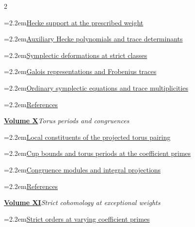 \documentclass[a4paper,11pt]{article}
\theoremstyle{definition}
\theoremstyle{remark}
\numberwithin{equation}{section}
\begin{document}
\begin{multicols}{2}
\begin{minipage}{\linewidth}
\noindent\hangindent=2.2em\hyperref[nav:chapter-fixed-weight-hecke]{Hecke support at the prescribed weight}\par
\noindent\hangindent=2.2em\hyperref[nav:hecke-polynomials]{Auxiliary Hecke polynomials and trace determinants}\par
\noindent\hangindent=2.2em\hyperref[nav:chapter-symplectic-classes]{Symplectic deformations at strict classes}\par
\noindent\hangindent=2.2em\hyperref[nav:chapter-galois-strict-frobenius]{Galois representations and Frobenius traces}\par
\noindent\hangindent=2.2em\hyperref[nav:chapter-ordinary-symplectic-equations]{Ordinary symplectic equations and trace multiplicities}\par
\noindent\hangindent=2.2em\hyperref[nav:bibliography-IX]{References}\par
\end{minipage}\par\medskip
\noindent\begin{minipage}{\linewidth}\raggedright
\textbf{\hyperref[nav:volume-X]{Volume X}}\enspace\emph{Torus periods and congruences}\par\smallskip
\noindent\hangindent=2.2em\hyperref[nav:torus-constituents]{Local constituents of the projected torus pairing}\par
\noindent\hangindent=2.2em\hyperref[nav:torus-primes]{Cup bounds and torus periods at the coefficient primes}\par
\noindent\hangindent=2.2em\hyperref[nav:torus-modules]{Congruence modules and integral projections}\par
\noindent\hangindent=2.2em\hyperref[nav:bibliography-X]{References}\par
\end{minipage}\par\medskip
\noindent\begin{minipage}{\linewidth}\raggedright
\textbf{\hyperref[nav:volume-XI]{Volume XI}}\enspace\emph{Strict cohomology at exceptional weights}\par\smallskip
\noindent\hangindent=2.2em\hyperref[nav:chapter-varying-coefficients]{Strict orders at varying coefficient primes}\par

\end{minipage}
\end{multicols}
\end{document}
